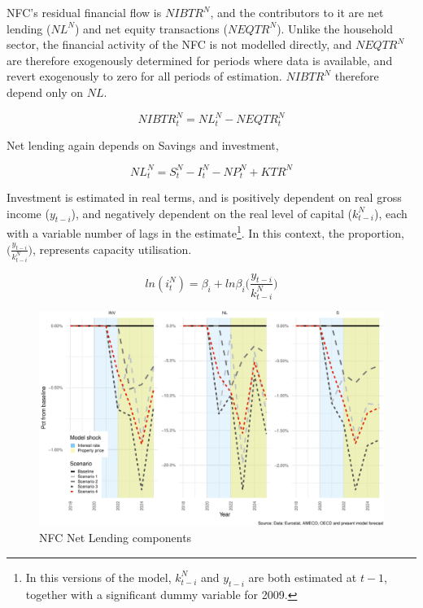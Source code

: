 \documentclass[
]{book}
\begin{document}
NFC's residual financial flow is \(NIBTR^N\), and the contributors to it are net lending (\(NL^N\)) and net equity transactions (\(NEQTR^N\)). Unlike the household sector, the financial activity of the NFC is not modelled directly, and \(NEQTR^N\) are therefore exogenously determined for periods where data is available, and revert exogenously to zero for all periods of estimation. \(NIBTR^N\) therefore depend only on \(NL\).

\begin{equation}
NIBTR^N_t = NL^N_t - NEQTR^N_t
\end{equation}

Net lending again depends on Savings and investment,

\begin{equation}
NL^N_t = S^N_t - I^N_t- NP^N_t + KTR^N
\end{equation}

Investment is estimated in real terms, and is positively dependent on real gross income (\(y_{t-i}\)), and negatively dependent on the real level of capital (\(k^N_{t-i}\)), each with a variable number of lags in the estimate\footnote{In this versions of the model, \(k^N_{t-i}\) and \(y_{t-i}\) are both estimated at \(t-1\), together with a significant dummy variable for 2009.}. In this context, the proportion, \(\Bigg( \frac{y_{t-i}}{k^N_{t-i}} \Bigg)\), represents capacity utilisation.

\begin{equation}
ln(i^N_t) = \beta _i + ln\beta _i \Bigg( \frac{y_{t-i}}{k^N_{t-i}}\Bigg)
\end{equation}

\begin{figure}
\centering
\includegraphics{figures/fl-fi-sfc-plot-nfc-indicators-nl-1.pdf}
\caption{\label{fig:fl-fi-sfc-plot-nfc-indicators-nl}NFC Net Lending components}
\end{figure}
\end{document}
